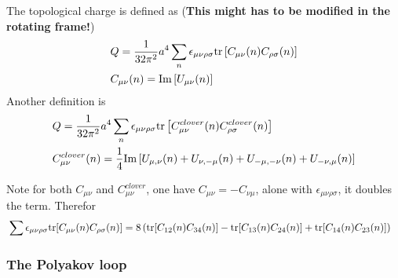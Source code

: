 The topological charge is defined as (\textbf{\textcolor[rgb]{1,0,0}{This might has to be modified in the rotating frame!}})
\begin{equation}
\begin{split}
&Q = \frac{1}{32\pi^2}a^4 \sum _n \epsilon _{\mu\nu\rho\sigma}{\rm tr}\left[C_{\mu\nu}(n)C_{\rho\sigma}(n)\right]\\
&C_{\mu\nu}(n)={\rm Im}\left[U_{\mu\nu}(n)\right]
\end{split}
\end{equation}
Another definition is
\begin{equation}
\begin{split}
&Q = \frac{1}{32\pi^2}a^4 \sum _n \epsilon _{\mu\nu\rho\sigma}{\rm tr}\left[C^{clover}_{\mu\nu}(n)C^{clover}_{\rho\sigma}(n)\right]\\
&C^{clover}_{\mu\nu}(n)=\frac{1}{4}{\rm Im}\left[U_{\mu,\nu}(n)+U_{\nu,-\mu}(n)+U_{-\mu,-\nu}(n)+U_{-\nu,\mu}(n)\right]
\end{split}
\end{equation}

Note for both $C_{\mu\nu}$ and $C_{\mu\nu}^{clover}$, one have $C_{\mu\nu}=-C_{\nu\mu}$, alone with $\epsilon _{\mu\nu\rho\sigma}$, it doubles the term. Therefor
\begin{equation}
\begin{split}
&\sum \epsilon _{\mu\nu\rho\sigma}{\rm tr}[C_{\mu\nu}(n)C_{\rho\sigma}(n)]=8 \left({\rm tr}[C_{12}(n)C_{34}(n)]-{\rm tr}[C_{13}(n)C_{24}(n)]+{\rm tr}[C_{14}(n)C_{23}(n)]\right)
\end{split}
\end{equation}

\subsubsection{\label{sec:RotatingPolyakovLoop}The Polyakov loop}

\clearpage
